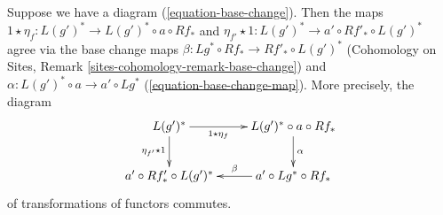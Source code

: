 \begin{lemma}
\label{lemma-unit-and-base-change}
Suppose we have a diagram (\ref{equation-base-change}). Then the maps
$1 \star \eta_f : L(g')^* \to L(g')^* \circ a \circ Rf_*$ and
$\eta_{f'} \star 1 : L(g')^* \to a' \circ Rf'_* \circ L(g')^*$
agree via the base change maps
$\beta : Lg^* \circ Rf_* \to Rf'_* \circ L(g')^*$
(Cohomology on Sites, Remark \ref{sites-cohomology-remark-base-change})
and $\alpha : L(g')^* \circ a \to a' \circ Lg^*$
(\ref{equation-base-change-map}).
More precisely, the diagram
$$
\xymatrix{
L(g')^* \ar[r]_-{1 \star \eta_f} \ar[d]_{\eta_{f'} \star 1} &
L(g')^* \circ a \circ Rf_* \ar[d]^\alpha \\
a' \circ Rf'_* \circ L(g')^* &
a' \circ Lg^* \circ Rf_* \ar[l]_-\beta
}
$$
of transformations of functors commutes.
\end{lemma}

